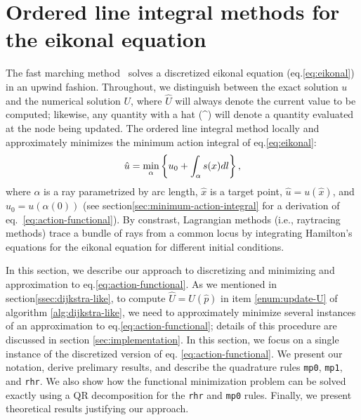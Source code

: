 \documentclass[smallcondensed]{svjour3}
\begin{document}
\section{Ordered line integral methods for the eikonal equation}\label{sec:olim}

The fast marching method~\cite{sethian1996fast} solves a discretized
eikonal equation (eq.\@ \ref{eq:eikonal}) in an upwind
fashion. Throughout, we distinguish between the exact solution $u$ and
the numerical solution $U$, where $\hat{U}$ will always denote the
current value to be computed; likewise, any quantity with a hat (\^{})
will denote a quantity evaluated at the node being updated. The
ordered line integral method locally and approximately minimizes the
minimum action integral of eq.\@ \ref{eq:eikonal}:
\begin{equation}
  \label{eq:action-functional}
  \hat{u} = \min_{\alpha} \left\{u_0 + \int_\alpha s(x) dl\right\},
\end{equation}
where $\alpha$ is a ray parametrized by arc length, $\hat{x}$ is a
target point, $\hat{u} = u(\hat{x})$, and $u_0 = u(\alpha(0))$ (see
section\@ \ref{sec:minimum-action-integral} for a derivation of eq.\
\ref{eq:action-functional}). By constrast, Lagrangian methods (i.e.,
raytracing methods) trace a bundle of rays from a common locus by
integrating Hamilton's equations for the eikonal equation for
different initial conditions.

In this section, we describe our approach to discretizing and
minimizing and approximation to eq.\@ \ref{eq:action-functional}. As
we mentioned in section\@ \ref{ssec:dijkstra-like}, to compute
$\hat{U} = U(\hat{p})$ in item \ref{enum:update-U} of algorithm
\ref{alg:dijkstra-like}, we need to approximately minimize several
instances of an approximation to eq.\@ \ref{eq:action-functional};
details of this procedure are discussed in section\@
\ref{sec:implementation}. In this section, we focus on a single
instance of the discretized version of eq.\@
\ref{eq:action-functional}. We present our notation, derive prelimary
results, and describe the quadrature rules \texttt{mp0}, \texttt{mp1},
and \texttt{rhr}. We also show how the functional minimization problem
can be solved exactly using a QR decomposition for the \texttt{rhr}
and \texttt{mp0} rules. Finally, we present theoretical results
justifying our approach.
\end{document}
